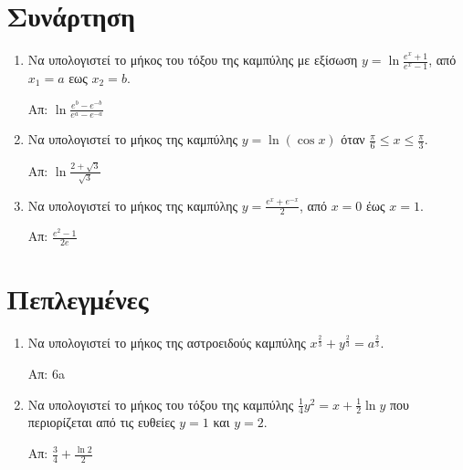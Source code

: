


\everymath{\displaystyle}
\thispagestyle{askhseis}



\begin{center}
  \minibox{\large\bfseries \textcolor{Col1}{Μήκος Καμπύλης}}
\end{center}

\vspace{\baselineskip}



\section*{Συνάρτηση}


\begin{enumerate}
  \item Να υπολογιστεί το μήκος του τόξου της καμπύλης με εξίσωση $ y =
    \ln{\frac{e^{x} + 1}{e^{x} - 1}}$, από $ x_{1} = a $ εως $ x_{2} = b $.

    \hfill Απ: $ \ln{\frac{e^{b} - e^{-b}}{e^{a} - e^{-a}}} $

  \item Να υπολογιστεί το μήκος της καμπύλης $y=\ln(\cos x)$ όταν 
    $\frac{\pi}{6}\leq x \leq \frac{\pi}{3}$.

    \hfill Απ: $\ln\frac{2+\sqrt{3}}{\sqrt{3}}$

  \item Να υπολογιστεί το μήκος της καμπύλης $y=\frac{e^{x}+e^{-x}}{2}$, από $x=0$ έως 
    $x=1$.

    \hfill Απ: $\frac{e^{2}-1}{2e}$
\end{enumerate}


\section*{Πεπλεγμένες}


\begin{enumerate}
  \item Να υπολογιστεί το μήκος της αστροειδούς καμπύλης $ x^{\frac{2}{3}}
    + y^{\frac{2}{3}} = a^{\frac{2}{3}} $.

    \hfill Απ: 6a



  \item Να υπολογιστεί το μήκος του τόξου της καμπύλης $ \frac{1}{4} y^{2} = x +
    \frac{1}{2} \ln{y} $ που περιορίζεται από τις ευθείες $ y = 1 $ και $ y =
    2$.

    \hfill Απ: $ \frac{3}{4} + \frac{\ln{2}}{2} $
\end{enumerate}


